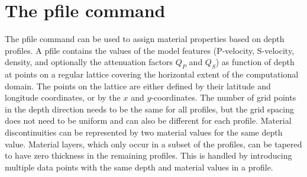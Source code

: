 \documentclass[11pt]{report}
\begin{document}
%

\section{The pfile command}\label{sec:pfile}
The pfile command can be used to assign material properties based on depth profiles. A pfile
contains the values of the model features (P-velocity, S-velocity, density, and optionally the
attenuation factors $Q_P$ and $Q_S$) as function of depth at points on a regular lattice covering
the horizontal extent of the computational domain. The points on the lattice are either defined by
their latitude and longitude coordinates, or by the $x$ and $y$-coordinates. The number of grid
points in the depth direction needs to be the same for all profiles, but the grid spacing does not
need to be uniform and can also be different for each profile. Material discontinuities can be
represented by two material values for the same depth value. Material layers, which only occur in a
subset of the profiles, can be tapered to have zero thickness in the remaining profiles. This is
handled by introducing multiple data points with the same depth and material values in a profile.
\end{document}
